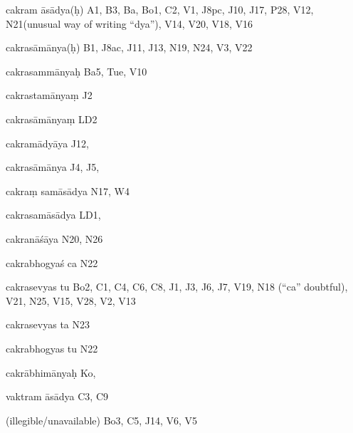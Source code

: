 \begin{ekdosis}
\begin{marma}[hp01_055]
\begin{marma}[hp02_009]
\begin{marma}[hp02_011]
\begin{marma}[hp02_54a]
\begin{description}
        \end{description}
      \end{marma}


      \begin{marma}[hp02_55a]
      \item[cakram āsādya(ḥ)] A1, B3, Ba, Bo1, C2, V1, J8pc, J10, J17, P28, V12, N21(unusual way of writing “dya”), V14, V20, V18, V16
      \item[cakrasāmānya(ḥ)] B1, J8ac, J11, J13, N19, N24, V3, V22
      \item[cakrasammānyaḥ] Ba5, Tue, V10
      \item[cakrastamānyaṃ] J2
      \item[cakrasāmānyaṃ] LD2
      \item[cakramādyāya] J12,
      \item[cakrasāmānya] J4, J5,
      \item[cakraṃ samāsādya] N17, W4
      \item[cakrasamāsādya] LD1,
      \item[cakranāśāya] N20, N26
      \item[cakrabhogyaś ca] N22
      \item[cakrasevyas tu] Bo2, C1, C4, C6, C8, J1, J3, J6, J7, V19, N18 (“ca” doubtful), V21, N25, V15, V28, V2, V13
      \item[cakrasevyas ta] N23
      \item[cakrabhogyas tu] N22
      \item[cakrābhimānyaḥ] Ko,
      \item[vaktram āsādya] C3, C9
      \item[(illegible/unavailable)] Bo3, C5, J14, V6, V5
        \begin{description}

        \end{description}
      \end{marma}



\end{marma}
\end{marma}
\end{marma}
\end{ekdosis}

